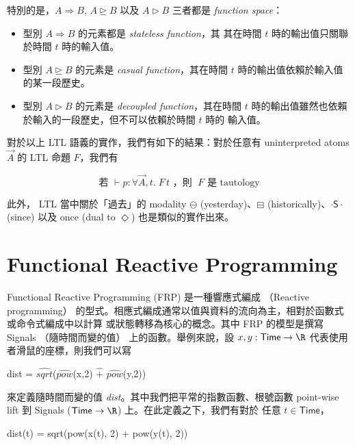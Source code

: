 \documentclass{article}
\newcommand{\Time}{\mathsf{Time}}
\begin{document}
  特別的是，$A\Rightarrow B$, $A\unrhd B$ 以及 $A\rhd B$ 三者都是
  \emph{function space}：

  \begin{itemize}
    \item 型別 $A\Rightarrow B$ 的元素都是 \emph{stateless function}，其
    其在時間 $t$ 時的輸出值只關聯於時間 $t$ 時的輸入值。

    \item 型別 $A\unrhd B$ 的元素是 \emph{casual function}，其在時間 $t$
    時的輸出值依賴於輸入值的某一段歷史。

    \item 型別 $A\rhd B$ 的元素是 \emph{decoupled function}，其在時間 $t$
    時的輸出值雖然也依賴於輸入的一段歷史，但不可以依賴於時間 $t$ 時的
    輸入值。
  \end{itemize}

  對於以上 LTL 語義的實作，我們有如下的結果：對於任意有 uninterpreted atoms
  $\overrightarrow{A}$ 的 LTL 命題 $F$，我們有

  \[ \text{若 } \vdash p:\forall{\overrightarrow{A}},t.\; F\,t \text{ ，則 } \;F \text{ 是 tautology}\]

  此外， LTL 當中關於「過去」的 modality $\ominus$ (yesterday)、$\boxminus$
  (historically)、$\cdot\mathsf{S}\cdot$ (since) 以及 once (dual to $\Diamond$)
  也是類似的實作出來。

\section{Functional Reactive Programming}
  Functional Reactive Programming (FRP) 是一種響應式編成
  （Reactive programming）
  的型式。相應式編成通常以值與資料的流向為主，相對於函數式或命令式編成中以計算
  或狀態轉移為核心的概念。其中 FRP 的模型是撰寫 Signals （隨時間而變的值）
  上的函數。舉例來說，設 $x,y:\Time\to\R$ 代表使用者滑鼠的座標，則我們可以寫

  \begin{code}
  dist = $\widehat{\mathit{sqrt}}$($\widehat{\mathit{pow}}$(x,2) $\widehat{+}$ $\widehat{\mathit{pow}}$(y,2))
  \end{code}

  來定義隨時間而變的值 \textit{dist}。其中我們把平常的指數函數、根號函數
  point-wise lift 到 Signals ($\Time\to\R$) 上。在此定義之下，我們有對於
  任意 $t\in\Time$，

  \begin{code}
  dist(t) = sqrt(pow(x(t), 2) + pow(y(t), 2))
  \end{code}
\end{document}
